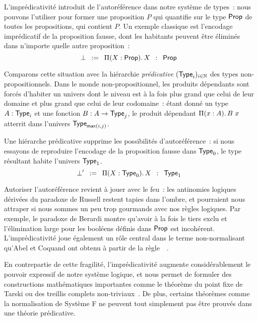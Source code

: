 L'imprédicativité introduit de l'autoréférence dans notre système 
de types~: nous pouvons l'utiliser pour former une proposition \( P \) qui 
quantifie sur le type \( \varProp \) de toutes les propositions, qui 
contient \( P \). 
% 
Un exemple classique est l'encodage imprédicatif de la proposition fausse, 
dont les habitants peuvent être éliminés dans n'importe quelle autre proposition~:
\[
\bot \enskip := \enskip \Depfun[X]{\varProp}{X} \enskip : \enskip \varProp
\]

Comparons cette situation avec la hiérarchie \emph{prédicative} 
$(\varType_i)_{i \in \Nat}$ 
% 
% 
des types non-propositionnels.
% 
Dans le monde non-propositionnel, les produits dépendants sont forcés d'habiter 
un univers dont le niveau est à la fois plus grand que celui de leur domaine et
plus grand que celui de leur codomaine~:
% 
étant donné un type \( A : \varType_i \) et une fonction \( {\tm{B}{A \to \varType_j}} \), 
le produit dépendant \( \Depfun{A}{B\ x} \) atterrit dans l'univers
\( \varType_{\mathsf{max}(i,j)} \).
 
Une hiérarche prédicative supprime les possibilités d'autoréférence~: si nous essayons 
de reproduire l'encodage de la proposition fausse dans \( \varType_0 \), le 
type résultant habite l'univers \( \varType_1 \).
\[
\bot' \enskip := \enskip \Depfun[X]{\varType_0}{X} \enskip : \enskip \varType_1
\]

Autoriser l'autoréférence revient à jouer avec le feu~: les antinomies 
logiques dérivées du paradoxe de Russell restent tapies dans l'ombre, et 
pourraient nous attraper si nous sommes un peu trop gourmands avec nos 
règles logiques.
% 
Par exemple, le paradoxe de Berardi montre qu'avoir à la fois le tiers exclu et 
l'élimination large pour les booléens définis dans \( \varProp \) est incohérent. 
% 
L'imprédicativité joue également un rôle central dans le terme 
non-normalisant qu'Abel et Coquand ont obtenu à partir de la 
règle~~.

En contrepartie de cette fragilité, l'imprédicativité augmente considérablement 
le pouvoir expressif de notre système logique, et nous permet de formuler 
des constructions mathématiques importantes comme le théorème du point fixe 
de Tarski ou des treillis complets non-triviaux~. 
% 
De plus, certains théorèmes comme la normalisation de Système F ne peuvent tout
simplement pas être prouvés dans une théorie prédicative.

